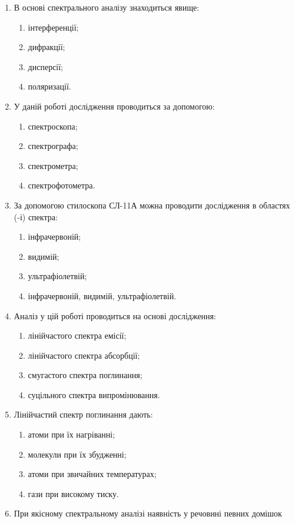 \documentclass[twocolumn]{el-author}
\begin{document}
\begin{enumerate}
	\item В основі спектрального аналізу знаходиться явище:
	\begin{enumerate}
		\item інтерференції;
		\item дифракції;
		\item дисперсії;
		\item поляризації.
	\end{enumerate}
	\item У даній роботі дослідження проводиться за допомогою:
	\begin{enumerate}
		\item спектроскопа;
		\item спектрографа;
		\item спектрометра;
		\item спектрофотометра.
	\end{enumerate}
	\item За допомогою стилоскопа СЛ-11А можна проводити дослідження в
областях (-і) спектра:
	\begin{enumerate}
		\item інфрачервоній;
		\item видимій;
		\item ультрафіолетвій;
		\item інфрачервоній, видимій, ультрафіолетвій.
	\end{enumerate}
	\item Аналіз у цій роботі проводиться на основі дослідження:
	\begin{enumerate}
		\item лінійчастого спектра емісії;
		\item лінійчастого спектра абсорбції;
		\item смугастого спектра поглинання;
		\item суцільного спектра випромінювання.
	\end{enumerate}
	\item Лінійчастий спектр поглинання дають:
	\begin{enumerate}
		\item атоми при їх нагріванні;
		\item молекули при їх збудженні;
		\item атоми при звичайних температурах;
		\item гази при високому тиску.
	\end{enumerate}
	\item При якісному спектральному аналізі наявність у речовині певних домішок

\end{enumerate}
\end{document}
